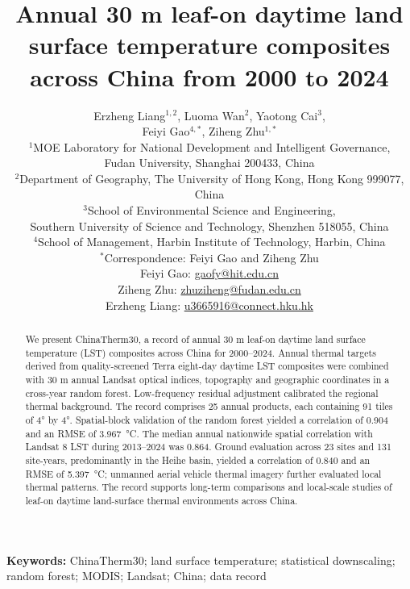 \documentclass[11pt,a4paper]{article}
\title{Annual 30 m leaf-on daytime land surface temperature composites across China from 2000 to 2024}
\author{%
Erzheng Liang$^{1,2}$, Luoma Wan$^{2}$, Yaotong Cai$^{3}$,\\
Feiyi Gao$^{4,*}$, Ziheng Zhu$^{1,*}$\\[0.5em]
\small $^{1}$MOE Laboratory for National Development and Intelligent Governance,\\
\small Fudan University, Shanghai 200433, China\\
\small $^{2}$Department of Geography, The University of Hong Kong, Hong Kong 999077, China\\
\small $^{3}$School of Environmental Science and Engineering,\\
\small Southern University of Science and Technology, Shenzhen 518055, China\\
\small $^{4}$School of Management, Harbin Institute of Technology, Harbin, China\\[0.4em]
\small $^{*}$Correspondence: Feiyi Gao and Ziheng Zhu\\
\small Feiyi Gao: \href{mailto:gaofy@hit.edu.cn}{gaofy@hit.edu.cn}\\
\small Ziheng Zhu: \href{mailto:zhuziheng@fudan.edu.cn}{zhuziheng@fudan.edu.cn}\\
\small Erzheng Liang: \href{mailto:u3665916@connect.hku.hk}{u3665916@connect.hku.hk}}
\date{}
\newcommand{\chinatherm}{ChinaTherm30}
\begin{document}
\ifdefined\LineNumberedReview\modulolinenumbers[1]\linenumbers\fi
\maketitle
\begin{abstract}
We present \chinatherm{}, a record of annual 30 m leaf-on daytime land surface temperature (LST) composites across China for 2000--2024. Annual thermal targets derived from quality-screened Terra eight-day daytime LST composites were combined with 30 m annual Landsat optical indices, topography and geographic coordinates in a cross-year random forest. Low-frequency residual adjustment calibrated the regional thermal background. The record comprises 25 annual products, each containing 91 tiles of 4° by 4°. Spatial-block validation of the random forest yielded a correlation of 0.904 and an RMSE of 3.967~°C. The median annual nationwide spatial correlation with Landsat 8 LST during 2013--2024 was 0.864. Ground evaluation across 23 sites and 131 site-years, predominantly in the Heihe basin, yielded a correlation of 0.840 and an RMSE of 5.397~°C; unmanned aerial vehicle thermal imagery further evaluated local thermal patterns. The record supports long-term comparisons and local-scale studies of leaf-on daytime land-surface thermal environments across China.
\end{abstract}
\noindent\textbf{Keywords:} ChinaTherm30; land surface temperature; statistical downscaling; random forest; MODIS; Landsat; China; data record






\printbibliography[title={References}]

\end{document}
